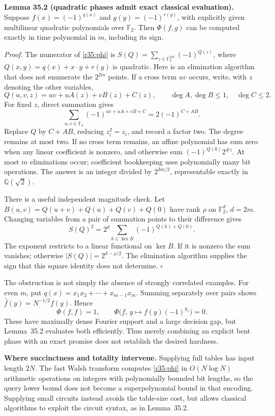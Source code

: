 \documentclass[11pt,a4paper]{article}
\newcommand{\Q}{\mathbb{Q}}
\newcommand{\F}{\mathbb{F}}
\numberwithin{equation}{section}
\begin{document}
\medskip
\textbf{Lemma 35.2 (quadratic phases admit exact classical evaluation).}
Suppose $f(x)=(-1)^{q(x)}$ and $g(y)=(-1)^{r(y)}$, with explicitly given
multilinear quadratic polynomials over $\F_2$. Then $\Phi(f,g)$ can be
computed exactly in time polynomial in $m$, including its sign.

\emph{Proof.} The numerator of \eqref{r35:phi} is
$S(Q)=\sum_{z\in\F_2^{2m}}(-1)^{Q(z)}$, where
$Q(x,y)=q(x)+x\cdot y+r(y)$ is quadratic. Here is an elimination algorithm
that does not enumerate the $2^{2m}$ points. If a cross term $uv$ occurs,
write, with $z$ denoting the other variables,
\[
 Q(u,v,z)=uv+uA(z)+vB(z)+C(z),
 \qquad \deg A,\deg B\le1,\quad\deg C\le2.
\]
For fixed $z$, direct summation gives
\begin{equation}\label{r35:eliminate}
 \sum_{u,v\in\F_2}(-1)^{uv+uA+vB+C}=2(-1)^{C+AB}.
\end{equation}
Replace $Q$ by $C+AB$, reducing $z_i^2=z_i$, and record a factor two.
The degree remains at most two. If no cross term remains, an affine
polynomial has sum zero when any linear coefficient is nonzero, and
otherwise sum $(-1)^{Q(0)}2^{\#z}$. At most $m$ eliminations occur;
coefficient bookkeeping uses polynomially many bit operations. The answer
is an integer divided by $2^{3m/2}$, representable exactly in $\Q(\sqrt2)$.

There is a useful independent magnitude check. Let
$B(u,v)=Q(u+v)+Q(u)+Q(v)+Q(0)$ have rank $\rho$ on $\F_2^d$, $d=2m$.
Changing variables from a pair of summation points to their difference gives
\[
 S(Q)^2=2^d\sum_{h\in\ker B}(-1)^{Q(h)+Q(0)}.
\]
The exponent restricts to a linear functional on $\ker B$. If it is
nonzero the sum vanishes; otherwise $|S(Q)|=2^{d-\rho/2}$. The elimination
algorithm supplies the sign that this square identity does not determine.
\hfill$\square$

The obstruction is not simply the absence of strongly correlated examples.
For even $m$, put
$q(x)=x_1x_2+\cdots+x_{m-1}x_m$. Summing separately over pairs shows
$\widehat f(y)=N^{-1/2}f(y)$. Hence
\[
 \Phi(f,f)=1,\qquad
 \Phi\bigl(f,\,y\mapsto f(y)(-1)^{y_1}\bigr)=0.
\]
These have maximally dense Fourier support and a large decision gap, but
Lemma~35.2 evaluates both efficiently. Thus merely combining an explicit
bent phase with an exact promise does not establish the desired hardness.

\medskip
\textbf{Where succinctness and totality intervene.}
Supplying full tables has input length $2N$. The fast Walsh transform
computes \eqref{r35:phi} in $O(N\log N)$ arithmetic operations on integers
with polynomially bounded bit lengths, so the query lower bound does not
become a superpolynomial bound in that encoding. Supplying small circuits
instead avoids the table-size cost, but allows classical algorithms to
exploit the circuit syntax, as in Lemma~35.2.
\end{document}
